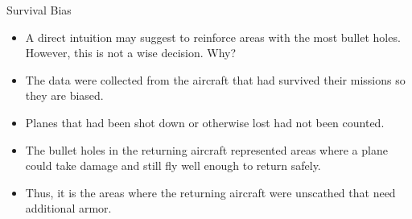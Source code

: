 \documentclass[serif,envcountsect,table,t]{beamer}%
\begin{document}
\begin{frame}{Survival Bias}
  \begin{itemize} %
  \item A direct intuition may suggest to reinforce areas with the most bullet holes. However, this is not a wise decision. Why? 
  \item The data were collected from the aircraft that had survived their missions so they are biased. 
  \item Planes that had been shot down or otherwise lost had not been counted. 
  \item The bullet holes in the returning aircraft represented areas where a plane could take damage and still fly well enough to return safely. 
  \item Thus, it is the areas where the returning aircraft were unscathed that need additional armor.
  \end{itemize}
\end{frame}
\end{document}
